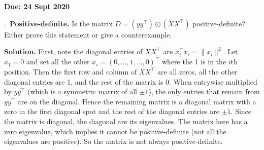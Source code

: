 \documentclass{letter}
\newcounter{problem}
\newcommand{\Problem}[2]{%
	\stepcounter{problem}%
	\leftskip=0pt%
	\theproblem.~\textbf{{#1.}} #2 \par%
}
\newcommand{\Solution}[1]{%
	\textbf{Solution.} #1 \par%
}
\newcommand{\Due}[1]{\textbf{Due: #1} \par}
\newcommand{\T}{\intercal}
\begin{document}
    \Due{24 Sept 2020}
    \Problem{Positive-definite}{Is the matrix $D = (yy^\T) \odot (XX^\T)$ positive-definite? Either prove this statement or give a counterexample.}
    \Solution{First, note the diagonal entries of $XX^\T$ are $x_i^\T x_i = \|x_i\|^2$. Let $x_1 = 0$ and set all the other $x_i = (0, \dots, 1, \dots, 0)^\T$ where the 1 is in the $i$th position. Then the first row and column of $XX^\T$ are all zeros, all the other diagonal entries are 1, and the rest of the matrix is 0. When entrywise multiplied by $yy^\T$ (which is a symmetric matrix of all $\pm 1$), the only entries that remain from $yy^\T$ are on the diagonal. Hence the remaining matrix is a diagonal matrix with a zero in the first diagonal spot and the rest of the diagonal entries are $\pm 1$. Since the matrix is diagonal, the diagonal are its eigenvalues. The matrix here has a zero eigenvalue, which implies it cannot be positive-definite (not all the eigenvalues are positive). So the matrix is not always positive-definite.}
\end{document}
